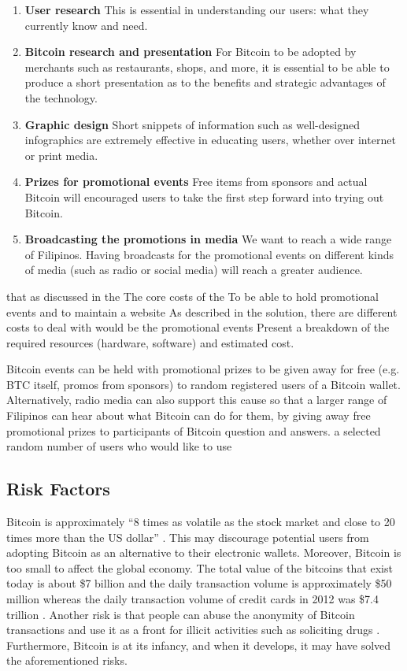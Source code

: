 \documentclass{acm_proc_article-sp}
\begin{document}
\begin{enumerate}
	\item \textbf{User research} This is essential in understanding our users: what they currently know and need.
	\item \textbf{Bitcoin research and presentation} For Bitcoin to be adopted by merchants such as restaurants, shops, and more, it is essential to be able to produce a short presentation as to the benefits and strategic advantages of the technology.
	\item \textbf{Graphic design} Short snippets of information such as well-designed infographics are extremely effective in educating users, whether over internet or print media.
	\item \textbf{Prizes for promotional events} Free items from sponsors and actual Bitcoin will encouraged users to take the first step forward into trying out Bitcoin.
	\item \textbf{Broadcasting the promotions in media} We want to reach a wide range of Filipinos. Having broadcasts for the promotional events on different kinds of media (such as radio or social media) will reach a greater audience.
\end{enumerate}

that as discussed in the The core costs of the To be able to hold promotional events and to maintain a website As described in the solution, there are different costs to deal with would be the promotional events Present a breakdown of the required resources (hardware, software) and estimated cost.

Bitcoin events can be held with promotional prizes to be given away for free (e.g. BTC itself, promos from sponsors) to random registered users of a Bitcoin wallet. Alternatively, radio media can also support this cause so that a larger range of Filipinos can hear about what Bitcoin can do for them, by giving away free promotional prizes to participants of Bitcoin question and answers. a selected random number of users who would like to use 

\subsection{Risk Factors}
Bitcoin is approximately ``8 times as volatile as the stock market and close to 20 times more than the US dollar'' \cite{BitcoinMyths:08182014}. This may discourage potential users from adopting Bitcoin as an alternative to their electronic wallets. Moreover, Bitcoin is too small to affect the global economy. The total value of the bitcoins that exist today is about \$7 billion and the daily transaction volume is approximately \$50 million whereas the daily transaction volume of credit cards in 2012 was \$7.4 trillion \cite{BitcoinMyths:08182014}. Another risk is that people can abuse the anonymity of Bitcoin transactions and use it as a front for illicit activities such as soliciting drugs \cite{Worldbank:2014}. Furthermore, Bitcoin is at its infancy, and when it develops, it may have solved the aforementioned risks.
\end{document}
